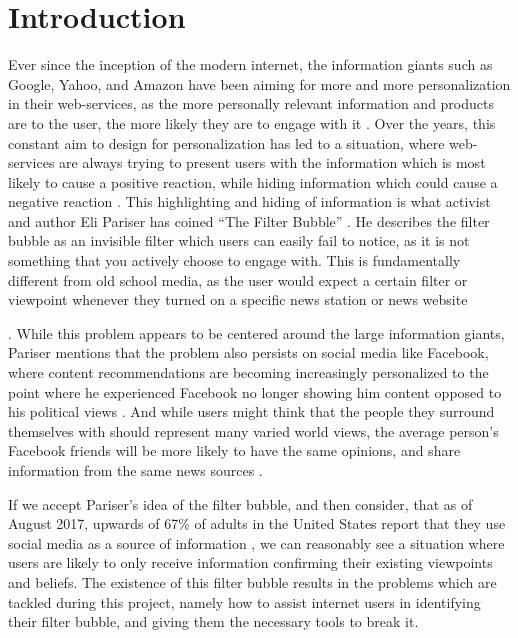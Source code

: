 \chapter{Introduction}\label{ch:intro} 

Ever since the inception of the modern internet, the information giants such as
Google, Yahoo, and Amazon have been aiming for more and more personalization in
their web-services, as the more personally relevant information and products are
to the user, the more likely they are to engage with it 
\citep[p.8]{pariser2011filter}. Over the years, this constant aim to design for
personalization has led to a situation, where web-services are always trying to
present users with the information which is most likely to cause a positive
reaction, while hiding information which could cause a negative
reaction \citep{filterBubbleDef, Personality}. This highlighting and hiding of
information is what activist and author Eli Pariser has coined ``The Filter
Bubble'' \citep[p.9]{pariser2011filter}. He describes the filter bubble as an
invisible filter which users can easily fail to notice, as it is not something
that you actively choose to engage with. This is fundamentally different from
old school media, as the user would expect a certain filter or viewpoint
whenever they turned on a specific news station or news website

\citep[p.10]{pariser2011filter}. While this problem appears to be centered
around the large information giants, Pariser mentions that the problem also
persists on social media like Facebook, where content recommendations are
becoming increasingly personalized to the point where he experienced Facebook no
longer showing him content opposed to his political views
\citep{pariserTedSummary}. And while users might think that the people they
surround themselves with should represent many varied world views, the average
person's Facebook friends will be more likely to have the same opinions, and
share information from the same news sources \citep[p.66]{pariser2011filter}.\nl

If we accept Pariser's idea of the filter bubble, and then consider, that as of
August 2017, upwards of 67\% of adults in the United States report that they use
social media as a source of information \citep{journalism2017}, we can
reasonably see a situation where users are likely to only receive information confirming
their existing viewpoints and beliefs. The existence of this filter
bubble results in the problems which are tackled during this project, namely
how to assist internet users in identifying their filter bubble, and giving them
the necessary tools to break it.

